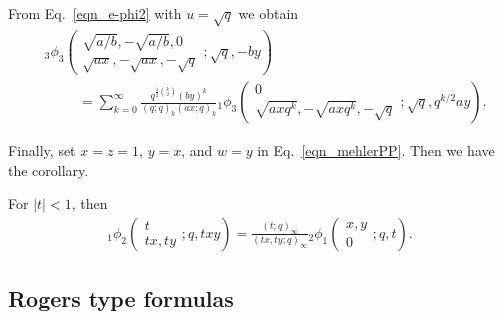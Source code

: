 \documentclass{cimart}
\begin{document}
\begin{corollary}
From Eq.~\eqref{eqn_e-phi2} with $u=\sqrt{q}$ we obtain
    \begin{align}
    &{}_{3}\phi_{3}\left(
    \begin{array}{c}
         \sqrt{a/b},-\sqrt{a/b},0\\
         \sqrt{ax},-\sqrt{ax},-\sqrt{q}
    \end{array}
    ;\sqrt{q},-by
    \right)\nonumber\\
    &\hspace{1cm}=\sum_{k=0}^{\infty}\frac{q^{\frac{1}{2}\binom{k}{2}}(by)^k}{(q;q)_{k}(ax;q)_{k}}{}_{1}\phi_{3}\left(
        \begin{array}{c}
             0 \\
             \sqrt{axq^k},-\sqrt{axq^k},-\sqrt{q}
        \end{array};
        \sqrt{q},q^{k/2}ay
        \right).
\end{align}
\end{corollary}
Finally, set $x=z=1$, $y=x$, and $w=y$ in Eq.~\eqref{eqn_mehlerPP}. Then we have the corollary.
\begin{corollary}
For $\vert t\vert<1$, then
\begin{align}
    {}_{1}\phi_{2}\left(
        \begin{array}{c}
             t \\
             tx,ty
        \end{array};
        q,txy
        \right)=\frac{(t;q)_{\infty}}{(tx,ty;q)_{\infty}}{}_{2}\phi_{1}\left(
        \begin{array}{c}
             x,y \\
             0
        \end{array};
        q,t
        \right).
\end{align}    
\end{corollary}

\subsection{Rogers type formulas}
\end{document}
